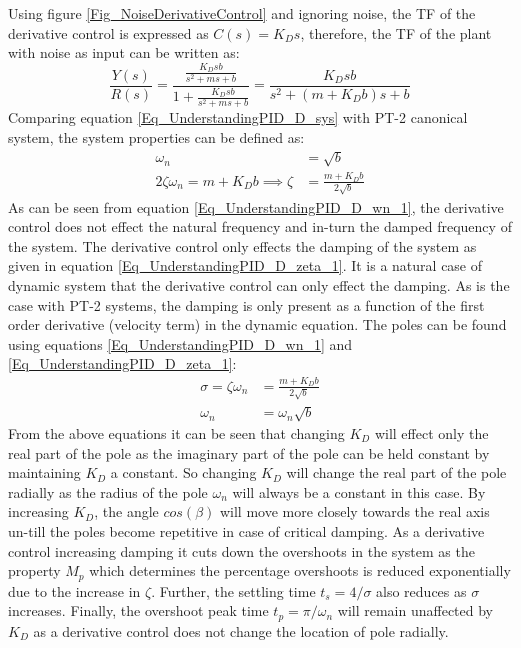 Using figure \ref{Fig_NoiseDerivativeControl} and ignoring noise, the TF of the derivative control is expressed as $C(s) = K_D s$, therefore, the TF of the plant with noise as input can be written as:
\begin{equation} \label{Eq_UnderstandingPID_D_sys}
	\frac{Y(s)}{R(s)} = \frac{\frac{K_{D}s b}{s^2 + m s + b}}{1 + \frac{K_{D}s b}{s^2 + m s + b}} = \frac{K_{D}s b}{s^2 + (m + K_{D} b)s + b}
\end{equation}
Comparing equation \eqref{Eq_UnderstandingPID_D_sys} with PT-2 canonical system, the system properties can be defined as:
\begin{align}
	\omega_{n} &= \sqrt{b} \label{Eq_UnderstandingPID_D_wn_1} \\
	2 \zeta \omega_{n} = m + K_{D} b \implies \zeta &= \frac{m + K_{D} b}{2 \sqrt{b}} \label{Eq_UnderstandingPID_D_zeta_1}
\end{align}
As can be seen from equation \eqref{Eq_UnderstandingPID_D_wn_1}, the derivative control does not effect the natural frequency and in-turn the damped frequency of the system. The derivative control only effects the damping of the system as given in equation \eqref{Eq_UnderstandingPID_D_zeta_1}. It is a natural case of dynamic system that the derivative control can only effect the damping. As is the case with PT-2 systems, the damping is only present as a function of the first order derivative (velocity term) in the dynamic equation. The poles can be found using equations \eqref{Eq_UnderstandingPID_D_wn_1} and \eqref{Eq_UnderstandingPID_D_zeta_1}:
\begin{align}
	\sigma = \zeta \omega_{n} &= \frac{m + K_{D} b}{2 \sqrt{b}} \\
	\omega_{n}  &= \omega_{n} \sqrt{b}
\end{align}
From the above equations it can be seen that changing $K_D$ will effect only the real part of the pole as the imaginary part of the pole can be held constant by maintaining $K_D$ a constant. So changing $K_D$ will change the real part of the pole radially as the radius of the pole $\omega_{n}$ will always be a constant in this case. By increasing $K_D$, the angle $cos(\beta)$ will move more closely towards the real axis un-till the poles become repetitive in case of critical damping. As a derivative control increasing damping it cuts down the overshoots in the system as the property $M_p$ which determines the percentage overshoots is reduced exponentially due to the increase in $\zeta$. Further, the settling time $t_s = 4 / \sigma$ also reduces as $\sigma$ increases. Finally, the overshoot peak time $t_p = \pi / \omega_{n}$ will remain unaffected by $K_D$ as a derivative control does not change the location of pole radially.

